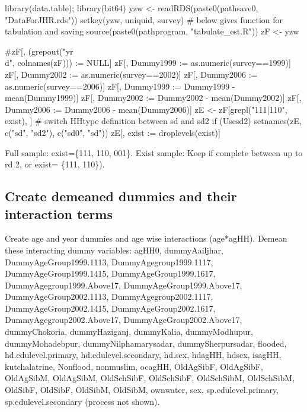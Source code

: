 \begin{Schunk}
\begin{Sinput}
library(data.table); library(bit64)
yzw <- readRDS(paste0(pathsave0, "DataForJHR.rds"))
setkey(yzw, uniquid, survey)
# below gives function for tabulation and saving
source(paste0(pathprogram, "tabulate_est.R"))
zF <- yzw
\end{Sinput}
\end{Schunk}
\begin{Schunk}
\begin{Sinput}
#zF[, (grepout("yr\\d", colnames(zF))) := NULL]
zF[, Dummy1999 := as.numeric(survey==1999)]
zF[, Dummy2002 := as.numeric(survey==2002)]
zF[, Dummy2006 := as.numeric(survey==2006)]
zF[, Dummy1999 := Dummy1999 - mean(Dummy1999)]
zF[, Dummy2002 := Dummy2002 - mean(Dummy2002)]
zF[, Dummy2006 := Dummy2006 - mean(Dummy2006)]
zE <- zF[grepl("111|110", exist), ]
# switch HHtype definition between sd and sd2
if (Usesd2) setnames(zE, c("sd", "sd2"), c("sd0", "sd"))
zE[, exist := droplevels(exist)]
\end{Sinput}
\end{Schunk}

Full sample: \textsf{exist}=\{111, 110, 001\}. Exist sample: Keep if complete between up to rd 2, or \textsf{exist= \{111, 110\}}).


\subsection{Create demeaned dummies and their interaction terms}


Create age and year dummies and age wise interactions (age*agHH). Demean these interacting dummy variables: \textsf{\footnotesize agHH0, dummyAailjhar, DummyAgeGroup1999.1113, DummyAgegroup1999.1117, DummyAgeGroup1999.1415, DummyAgeGroup1999.1617, DummyAgegroup1999.Above17, DummyAgeGroup1999.Above17, DummyAgeGroup2002.1113, DummyAgegroup2002.1117, DummyAgeGroup2002.1415, DummyAgeGroup2002.1617, DummyAgegroup2002.Above17, DummyAgeGroup2002.Above17, dummyChokoria, dummyHaziganj, dummyKalia, dummyModhupur, dummyMohadebpur, dummyNilphamarysadar, dummySherpursadar, flooded, hd.edulevel.primary, hd.edulevel.secondary, hd.sex, hdagHH, hdsex, isagHH, kutchalatrine, Nonflood, nonmuslim, ocagHH, OldAgSibF, OldAgSibF, OldAgSibM, OldAgSibM, OldSchSibF, OldSchSibF, OldSchSibM, OldSchSibM, OldSibF, OldSibF, OldSibM, OldSibM, ownwater, sex, sp.edulevel.primary, sp.edulevel.secondary} (process not shown). 


